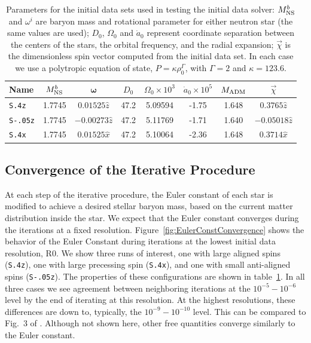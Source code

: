 {\begin{table}
\centering
\begin{tabular}{l|cc|ccc|cc}
Name & $M^b_{\rm NS}$ & ${\bm \omega}$ & $D_0$ & $\Omega_0 \times 10^{3}$ & $\dot{a}_0 
\times 10^{5}$  & $M_{\rm ADM}$ &  $\vec\chi$ 
\\\hline
{\tt S.4z} & 1.7745 & $0.01525\hat{z}$ & 47.2 & 5.09594 & -1.75 & 1.648 & $0.3765\hat{z}$ \\
{\tt S-.05z} & 1.7745 & $-0.00273\hat{z}$ & 47.2 & 5.11769 & -1.71 & 1.640 & $-0.05018\hat{z}$ \\
{\tt S.4x} & 1.7745 & $0.01525\hat{x}$ & 47.2 & 5.10064 & -2.36 & 1.648 & $0.3714\hat{x}$\\
\end{tabular}
\caption[Parameters for the initial data sets used in test the initial data solver.]{\label{tab:InitialData}
Parameters for the initial data sets used in testing the initial data solver: $M^b_{\rm NS}$ and $\omega^i$ are baryon mass and rotational parameter for either neutron star (the same values are used); $D_0$, $\Omega_0$ and $\dot a_{0}$ represent coordinate separation between the centers of the stars, the orbital frequency, and the radial expansion; $\vec\chi$ is the dimensionless spin vector computed from the initial data set. In each case we use a polytropic equation of state, $P=\kappa\rho_0^{\Gamma}$, with $\Gamma=2$ and $\kappa=123.6$.}
\end{table}


\subsection{Convergence of the Iterative Procedure}

At each step of the iterative procedure, the Euler constant of each
star is modified to achieve a desired stellar baryon mass, based on
the current matter distribution inside the star.  We expect that the Euler constant converges during the iterations at a fixed resolution. Figure~\ref{fig:EulerConstConvergence}  shows the behavior of the Euler Constant during iterations at the lowest initial data resolution, R0.  
We show three runs of interest, one
with large aligned spins ({\tt S.4z}), one with large precessing spin ({\tt S.4x}), and one with small anti-aligned spins ({\tt S-.05z}). The properties of these configurations are shown in table~\ref{tab:InitialData}.
In all three cases we see agreement between neighboring iterations at the
$10^{-5}-10^{-6}$ level by the end of iterating at this resolution. At the highest resolutions, these
differences are down to, typically, the $10^{-9}-10^{-10}$ level.
This can be compared to Fig.~3 of \cite{GourgoulhonEtAl2001a}.
Although not shown here, other free quantities converge similarly to the Euler constant.


}
